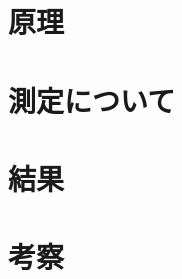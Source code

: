 \documentclass[uplatex,a4j,11pt,dvipdfmx]{jsarticle}
\newcommand{\gnu}[2]{
\begin{figure}[hptb]
\begin{center}

\caption{#1}
\label{fig:#2}
\end{center}
\end{figure}
}
\begin{document}
\section{原理}


\clearpage
\section{測定について}


\clearpage
\section{結果}
\clearpage
\clearpage
\section{考察}
\clearpage
\clearpage

\end{document}
